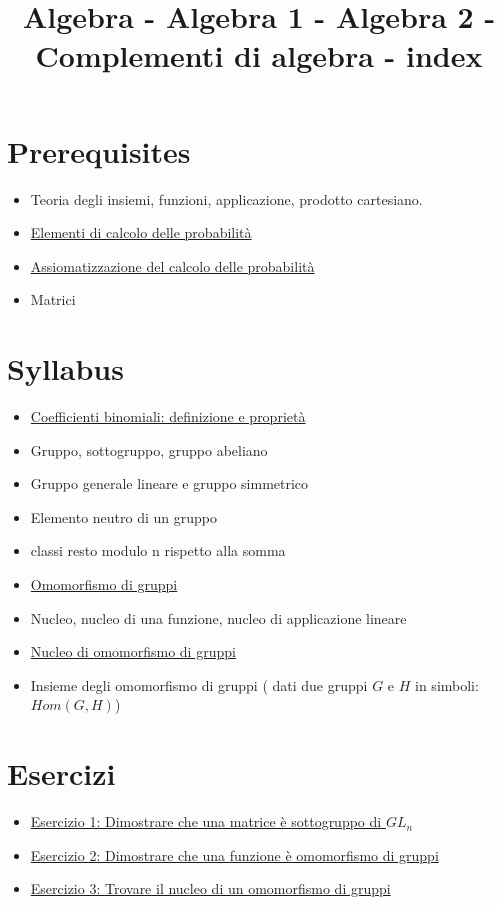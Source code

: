 \documentclass[a4paper,10pt]{article}
\title{Algebra - Algebra 1 - Algebra 2 - Complementi di algebra - index}
\author{}
\begin{document}
\maketitle



\section{Prerequisites}
\begin{itemize}
 \item Teoria degli insiemi, funzioni, applicazione, prodotto cartesiano.
 \item \href{./CalcProb.html}{Elementi di calcolo delle probabilità}
 \item \href{./AssiomiProb.html}{Assiomatizzazione del calcolo delle probabilità}
 \item Matrici
\end{itemize}

\section{Syllabus}
\begin{itemize}
 \item \href{./CoefficientiBinomiali.html}{Coefficienti binomiali: definizione e proprietà}
 \item Gruppo, sottogruppo, gruppo abeliano
 \item Gruppo generale lineare e gruppo simmetrico
 \item Elemento neutro di un gruppo
 \item classi resto modulo n rispetto alla somma
 \item \href{./OmomorfismoGruppi.html}{Omomorfismo di gruppi}
 \item Nucleo, nucleo di una funzione, nucleo di applicazione lineare
 \item \href{./Nucleo.html}{Nucleo di omomorfismo di gruppi}
 \item Insieme degli omomorfismo di gruppi ( dati due gruppi $G$ e $H$ in simboli: $Hom(G,H)$)
\end{itemize}

\section{Esercizi}
\begin{itemize}
 \item \href{./esercizio1.html}{Esercizio 1: Dimostrare che una matrice è sottogruppo di $GL_{n}$}
 \item \href{./esercizio2.html}{Esercizio 2: Dimostrare che una funzione è omomorfismo di gruppi}
 \item \href{./esercizio3.html}{Esercizio 3: Trovare il nucleo di un omomorfismo di gruppi}
\end{itemize}
\end{document}
